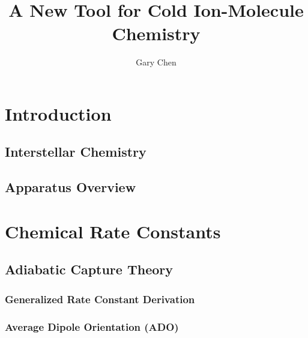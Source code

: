 \documentclass [PhD,nolistoftables,scheader] {uclathes}
\title          {A New Tool for Cold Ion-Molecule Chemistry}
\author         {Gary Chen}
\begin{document}
\makeintropages


\chapter{Introduction}
	
	
	\section{Interstellar Chemistry}
	
	
	\section{Apparatus Overview}
	
	
%	
	
\chapter{Chemical Rate Constants}
	
	
	\section{Adiabatic Capture Theory}
	
	
		\subsection{Generalized Rate Constant Derivation} \label{sec: ACT}
		
		
		\subsection{Average Dipole Orientation (ADO)} \label{sec: ADO}
		
	

%	
\end{document}
